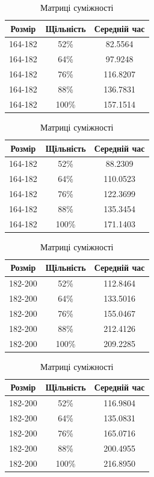\documentclass[titlepage, a4paper]{article}
\begin{document}
\begin{table}[htbp]
\begin{minipage}[b]{0.51\linewidth}
\begin{tabular}{|c|c|c|}
\hline
Розмір & Щільність & Середній час\\
\hline
164-182 & 52\% & 82.5564 \\
164-182  & 64\% & 97.9248 \\
164-182  & 76\% & 116.8207 \\
164-182  & 88\% & 136.7831 \\
164-182  & 100\% & 157.1514 \\
\hline
\end{tabular}
\caption{Списки суміжності}
\end{minipage}
\begin{minipage}[b]{0.51\linewidth}
\begin{tabular}{|c|c|c|}
\hline
Розмір & Щільність & Середній час\\
\hline
164-182  & 52\% & 88.2309 \\
164-182  & 64\% & 110.0523 \\
164-182  & 76\% & 122.3699 \\
164-182  & 88\% & 135.3454 \\
164-182  & 100\% & 171.1403 \\
\hline
\end{tabular}
\caption{Матриці суміжності}
\end{minipage}	
\end{table}
\begin{table}[htbp]
\begin{minipage}[b]{0.51\linewidth}
\begin{tabular}{|c|c|c|}
\hline
Розмір & Щільність & Середній час\\
\hline
182-200 & 52\% & 112.8464 \\
182-200  & 64\% & 133.5016 \\
182-200  & 76\% & 155.0467 \\
182-200  & 88\% & 212.4126 \\
182-200  & 100\% & 209.2285 \\
\hline
\end{tabular}
\caption{Списки суміжності}
\end{minipage}
\begin{minipage}[b]{0.51\linewidth}
\begin{tabular}{|c|c|c|}
\hline
Розмір & Щільність & Середній час\\
\hline
182-200  & 52\% & 116.9804 \\
182-200  & 64\% & 135.0831 \\
182-200  & 76\% & 165.0716 \\
182-200  & 88\% & 200.4955 \\
182-200  & 100\% & 216.8950 \\
\hline
\end{tabular}
\caption{Матриці суміжності}
\end{minipage}
\end{table}
\end{document}

